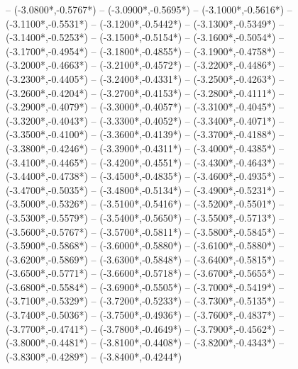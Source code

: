 {	-- ({-3.0800*\dx},{-0.5767*\dy})
	-- ({-3.0900*\dx},{-0.5695*\dy})
	-- ({-3.1000*\dx},{-0.5616*\dy})
	-- ({-3.1100*\dx},{-0.5531*\dy})
	-- ({-3.1200*\dx},{-0.5442*\dy})
	-- ({-3.1300*\dx},{-0.5349*\dy})
	-- ({-3.1400*\dx},{-0.5253*\dy})
	-- ({-3.1500*\dx},{-0.5154*\dy})
	-- ({-3.1600*\dx},{-0.5054*\dy})
	-- ({-3.1700*\dx},{-0.4954*\dy})
	-- ({-3.1800*\dx},{-0.4855*\dy})
	-- ({-3.1900*\dx},{-0.4758*\dy})
	-- ({-3.2000*\dx},{-0.4663*\dy})
	-- ({-3.2100*\dx},{-0.4572*\dy})
	-- ({-3.2200*\dx},{-0.4486*\dy})
	-- ({-3.2300*\dx},{-0.4405*\dy})
	-- ({-3.2400*\dx},{-0.4331*\dy})
	-- ({-3.2500*\dx},{-0.4263*\dy})
	-- ({-3.2600*\dx},{-0.4204*\dy})
	-- ({-3.2700*\dx},{-0.4153*\dy})
	-- ({-3.2800*\dx},{-0.4111*\dy})
	-- ({-3.2900*\dx},{-0.4079*\dy})
	-- ({-3.3000*\dx},{-0.4057*\dy})
	-- ({-3.3100*\dx},{-0.4045*\dy})
	-- ({-3.3200*\dx},{-0.4043*\dy})
	-- ({-3.3300*\dx},{-0.4052*\dy})
	-- ({-3.3400*\dx},{-0.4071*\dy})
	-- ({-3.3500*\dx},{-0.4100*\dy})
	-- ({-3.3600*\dx},{-0.4139*\dy})
	-- ({-3.3700*\dx},{-0.4188*\dy})
	-- ({-3.3800*\dx},{-0.4246*\dy})
	-- ({-3.3900*\dx},{-0.4311*\dy})
	-- ({-3.4000*\dx},{-0.4385*\dy})
	-- ({-3.4100*\dx},{-0.4465*\dy})
	-- ({-3.4200*\dx},{-0.4551*\dy})
	-- ({-3.4300*\dx},{-0.4643*\dy})
	-- ({-3.4400*\dx},{-0.4738*\dy})
	-- ({-3.4500*\dx},{-0.4835*\dy})
	-- ({-3.4600*\dx},{-0.4935*\dy})
	-- ({-3.4700*\dx},{-0.5035*\dy})
	-- ({-3.4800*\dx},{-0.5134*\dy})
	-- ({-3.4900*\dx},{-0.5231*\dy})
	-- ({-3.5000*\dx},{-0.5326*\dy})
	-- ({-3.5100*\dx},{-0.5416*\dy})
	-- ({-3.5200*\dx},{-0.5501*\dy})
	-- ({-3.5300*\dx},{-0.5579*\dy})
	-- ({-3.5400*\dx},{-0.5650*\dy})
	-- ({-3.5500*\dx},{-0.5713*\dy})
	-- ({-3.5600*\dx},{-0.5767*\dy})
	-- ({-3.5700*\dx},{-0.5811*\dy})
	-- ({-3.5800*\dx},{-0.5845*\dy})
	-- ({-3.5900*\dx},{-0.5868*\dy})
	-- ({-3.6000*\dx},{-0.5880*\dy})
	-- ({-3.6100*\dx},{-0.5880*\dy})
	-- ({-3.6200*\dx},{-0.5869*\dy})
	-- ({-3.6300*\dx},{-0.5848*\dy})
	-- ({-3.6400*\dx},{-0.5815*\dy})
	-- ({-3.6500*\dx},{-0.5771*\dy})
	-- ({-3.6600*\dx},{-0.5718*\dy})
	-- ({-3.6700*\dx},{-0.5655*\dy})
	-- ({-3.6800*\dx},{-0.5584*\dy})
	-- ({-3.6900*\dx},{-0.5505*\dy})
	-- ({-3.7000*\dx},{-0.5419*\dy})
	-- ({-3.7100*\dx},{-0.5329*\dy})
	-- ({-3.7200*\dx},{-0.5233*\dy})
	-- ({-3.7300*\dx},{-0.5135*\dy})
	-- ({-3.7400*\dx},{-0.5036*\dy})
	-- ({-3.7500*\dx},{-0.4936*\dy})
	-- ({-3.7600*\dx},{-0.4837*\dy})
	-- ({-3.7700*\dx},{-0.4741*\dy})
	-- ({-3.7800*\dx},{-0.4649*\dy})
	-- ({-3.7900*\dx},{-0.4562*\dy})
	-- ({-3.8000*\dx},{-0.4481*\dy})
	-- ({-3.8100*\dx},{-0.4408*\dy})
	-- ({-3.8200*\dx},{-0.4343*\dy})
	-- ({-3.8300*\dx},{-0.4289*\dy})
	-- ({-3.8400*\dx},{-0.4244*\dy})
}
